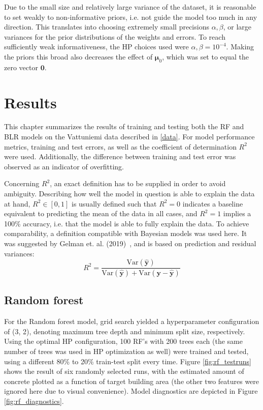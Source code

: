 \documentclass[english, 12pt, a4paper, sci, utf8, a-2b, online]{aaltothesis}
\begin{document}
Due to the small size and relatively large variance of the dataset, it is reasonable to set weakly to non-informative priors,
i.e. not guide the model too much in any direction. This translates into choosing extremely small precisions $\alpha, \beta$, or large variances for the prior distributions of the weights
and errors. To reach sufficiently weak informativeness, the HP choices used were $\alpha, \beta = 10^{-4}$. Making the priors this broad also decreases the effect of $\bm{\mu}_0$,
which was set to equal the zero vector $\bm{0}$.

\clearpage

\section{Results} \label{results}


This chapter summarizes the results of training and testing both the RF and BLR models on the Vattuniemi data described in \ref{data}. For model performance metrics, training and test errors,
as well as the coefficient of determination $R^2$ were used. Additionally, the difference between training and test error was observed as an indicator of overfitting.

Concerning $R^2$, an exact definition has to be supplied in order to avoid ambiguity. Describing how well the model in question is able to explain the data at hand, $R^2 \in \left[ 0, 1 \right]$
is usually defined such that $R^2=0$ indicates a baseline equivalent to predicting the mean of the data in all cases, and $R^2=1$ implies a 100\% accuracy, i.e. that the model is able to fully
explain the data. To achieve comparability, a definition compatible with Bayesian models was used here. It was suggested by Gelman et. al. (2019)~\cite{gelman}, and is based on prediction and
residual variances:
%
\begin{equation}
  R^2 = \frac{\text{Var}(\hat{\bm{y}})}{\text{Var}(\hat{\bm{y}}) + \text{Var}(\bm{y}-\hat{\bm{y}})}
\end{equation}
%

\subsection{Random forest}

For the Random forest model, grid search yielded a hyperparameter configuration of (3, 2), denoting maximum tree depth and minimum split size, respectively. Using the optimal
HP configuration, 100 RF's with 200 trees each (the same number of trees was used in HP optimization as well) were trained and tested, using a different 80\% to 20\% train-test split every time.
Figure \ref{fig:rf_testruns} shows the result of six randomly selected runs, with the estimated
amount of concrete plotted as a function of target building area (the other two features were ignored here due to visual convenience). Model diagnostics are depicted in
Figure \ref{fig:rf_diagnostics}.
\end{document}
